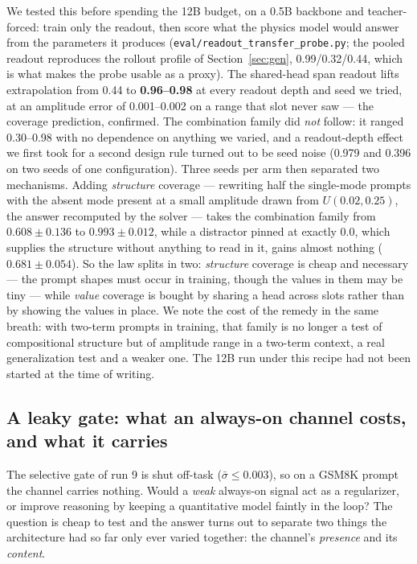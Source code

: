 \documentclass[11pt]{article}
\newcommand{\code}[1]{\texttt{#1}}
\begin{document}
We tested this before spending the 12B budget, on a 0.5B backbone and teacher-forced: train only the readout, then score what the physics model would answer from the parameters it produces (\code{eval/readout\_transfer\_probe.py}; the pooled readout reproduces the rollout profile of Section~\ref{sec:gen}, 0.99/0.32/0.44, which is what makes the probe usable as a proxy). The shared-head span readout lifts extrapolation from 0.44 to \textbf{0.96--0.98} at every readout depth and seed we tried, at an amplitude error of 0.001--0.002 on a range that slot never saw --- the coverage prediction, confirmed. The combination family did \emph{not} follow: it ranged 0.30--0.98 with no dependence on anything we varied, and a readout-depth effect we first took for a second design rule turned out to be seed noise (0.979 and 0.396 on two seeds of one configuration). Three seeds per arm then separated two mechanisms. Adding \emph{structure} coverage --- rewriting half the single-mode prompts with the absent mode present at a small amplitude drawn from $U(0.02, 0.25)$, the answer recomputed by the solver --- takes the combination family from $0.608 \pm 0.136$ to $\mathbf{0.993 \pm 0.012}$, while a distractor pinned at exactly $0.0$, which supplies the structure without anything to read in it, gains almost nothing ($0.681 \pm 0.054$). So the law splits in two: \emph{structure} coverage is cheap and necessary --- the prompt shapes must occur in training, though the values in them may be tiny --- while \emph{value} coverage is bought by sharing a head across slots rather than by showing the values in place. We note the cost of the remedy in the same breath: with two-term prompts in training, that family is no longer a test of compositional structure but of amplitude range in a two-term context, a real generalization test and a weaker one. The 12B run under this recipe had not been started at the time of writing.

\subsection{A leaky gate: what an always-on channel costs, and what it carries}
\label{sec:leaky}

The selective gate of run 9 is shut off-task ($\bar\sigma \le 0.003$), so on a GSM8K prompt the channel carries nothing. Would a \emph{weak} always-on signal act as a regularizer, or improve reasoning by keeping a quantitative model faintly in the loop? The question is cheap to test and the answer turns out to separate two things the architecture had so far only ever varied together: the channel's \emph{presence} and its \emph{content}.
\end{document}
